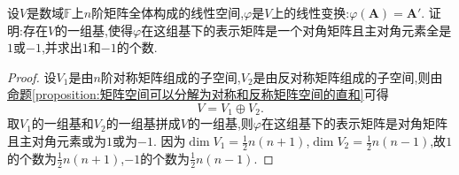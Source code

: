 \documentclass[../../main.tex]{subfiles}
\begin{document}
\begin{example}
设\(V\)是数域\(\mathbb{F}\)上\(n\)阶矩阵全体构成的线性空间,\(\varphi\)是\(V\)上的线性变换:\(\varphi(\boldsymbol{A})=\boldsymbol{A}'\). 证明:存在\(V\)的一组基,使得\(\varphi\)在这组基下的表示矩阵是一个对角矩阵且主对角元素全是\(1\)或\(-1\),并求出\(1\)和\(-1\)的个数.
\end{example}
\begin{proof}
设\(V_1\)是由\(n\)阶对称矩阵组成的子空间,\(V_2\)是由反对称矩阵组成的子空间,则由\hyperref[proposition:矩阵空间可以分解为对称和反称矩阵空间的直和]{命题\ref{proposition:矩阵空间可以分解为对称和反称矩阵空间的直和}}可得
\[
V = V_1\oplus V_2.
\]
取\(V_1\)的一组基和\(V_2\)的一组基拼成\(V\)的一组基,则\(\varphi\)在这组基下的表示矩阵是对角矩阵且主对角元素或为\(1\)或为\(-1\). 因为\(\dim V_1=\frac{1}{2}n(n + 1)\),\(\dim V_2=\frac{1}{2}n(n - 1)\),故\(1\)的个数为\(\frac{1}{2}n(n + 1)\),\(-1\)的个数为\(\frac{1}{2}n(n - 1)\).
\end{proof}
\end{document}
